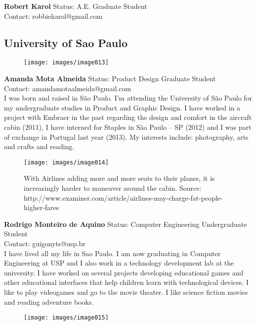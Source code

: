 \textbf{Robert Karol}
Status: A.E. Graduate Student \\
Contact: robbiekarol@gmail.com \\


\subsection*{University of Sao Paulo}

\begin{figure}[h]
  \centering
     \texttt{[image: images/image013]}
  \label{fig:13}
\end{figure}

\textbf{Amanda Mota Almeida}
Status: Product Design Graduate Student \\
Contact: amandamotaalmeida@gmail.com \\
I was born and raised in São Paulo. I’m attending the University of São Paulo for my undergraduate studies in Product and Graphic Design. I have worked in a project with Embraer in the past regarding the design and comfort in the aircraft cabin (2011), I have interned for Staples in São Paulo – SP (2012) and I was part of exchange in Portugal last year (2013). My interests include: photography, arts and crafts and reading.

\begin{figure}[h]
  \centering
     \texttt{[image: images/image014]}
   \caption{With Airlines adding more and more seats to their planes, it is increasingly harder to maneuver around the cabin.
                  Source: http://www.examiner.com/article/airlines-may-charge-fat-people-higher-fares}
  \label{fig:14}
\end{figure}

\textbf{Rodrigo Monteiro de Aquino}
Status: Computer Engineering Undergraduate Student \\
Contact: guigonyts@usp.br \\
I have lived all my life in Sao Paulo. I am now graduating in Computer Engineering at USP and I also work in a technology development lab at the university. I have worked on several projects developing educational games and other educational interfaces that help children learn with technological devices.  I like to play videogames and go to the movie theater. I like science fiction movies and reading adventure books.

\begin{figure}[h]
  \centering
     \texttt{[image: images/image015]}
  \label{fig:15}
\end{figure}

